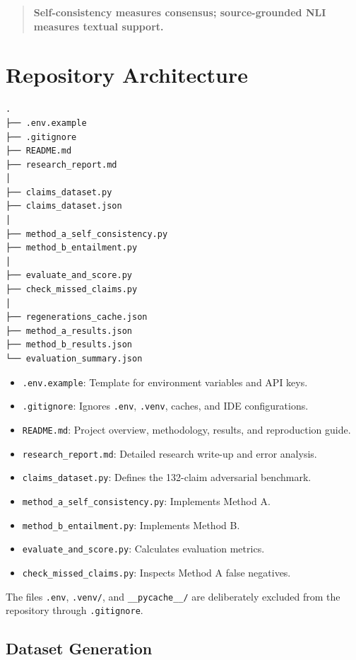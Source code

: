 \documentclass[11pt,a4paper]{article}
\begin{document}
\begin{quote}
\textbf{Self-consistency measures consensus; source-grounded NLI measures textual support.}
\end{quote}


\section{Repository Architecture}

\begin{lstlisting}
.
├── .env.example
├── .gitignore
├── README.md
├── research_report.md
│
├── claims_dataset.py
├── claims_dataset.json
│
├── method_a_self_consistency.py
├── method_b_entailment.py
│
├── evaluate_and_score.py
├── check_missed_claims.py
│
├── regenerations_cache.json
├── method_a_results.json
├── method_b_results.json
└── evaluation_summary.json
\end{lstlisting}

\begin{itemize}
    \item \texttt{.env.example}: Template for environment variables and API keys.
    \item \texttt{.gitignore}: Ignores \texttt{.env}, \texttt{.venv}, caches, and IDE configurations.
    \item \texttt{README.md}: Project overview, methodology, results, and reproduction guide.
    \item \texttt{research\_report.md}: Detailed research write-up and error analysis.
    \item \texttt{claims\_dataset.py}: Defines the 132-claim adversarial benchmark.
    \item \texttt{method\_a\_self\_consistency.py}: Implements Method A.
    \item \texttt{method\_b\_entailment.py}: Implements Method B.
    \item \texttt{evaluate\_and\_score.py}: Calculates evaluation metrics.
    \item \texttt{check\_missed\_claims.py}: Inspects Method A false negatives.
\end{itemize}

The files \texttt{.env}, \texttt{.venv/}, and \texttt{\_\_pycache\_\_/} are deliberately excluded from the repository through \texttt{.gitignore}.

\subsection{Dataset Generation}
\end{document}
